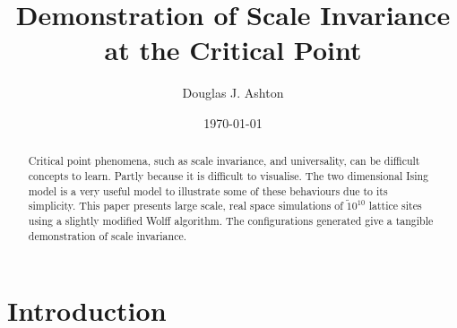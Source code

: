 \documentclass[aps,prl,reprint,groupedaddress]{revtex4-1}
\begin{document}

\title{Demonstration of Scale Invariance at the Critical Point}

\author{Douglas J. Ashton}


\date{\today}

\begin{abstract}
Critical point phenomena, such as scale invariance, and universality, can be difficult concepts to learn. Partly because it is difficult to visualise. The two dimensional Ising model is a very useful model to illustrate some of these behaviours due to its simplicity. This paper presents large scale, real space simulations of $ \tilde 10^10 $ lattice sites using a slightly modified Wolff algorithm. The configurations generated give a tangible demonstration of scale invariance.
\end{abstract}


\maketitle

\section{Introduction}{\label{sec-intro}}
\end{document}
